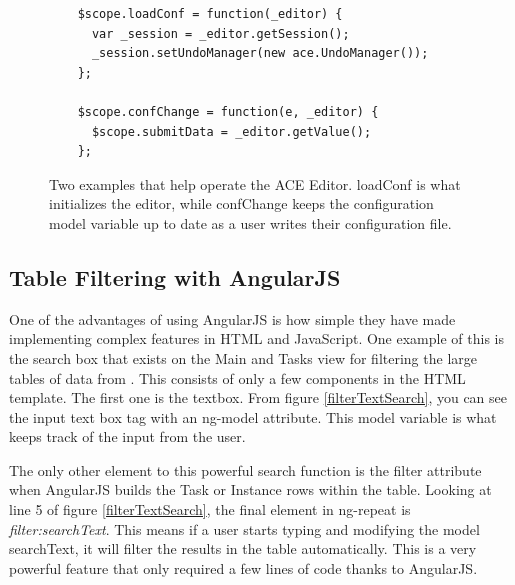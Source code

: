 \begin{figure}[H]
  \begin{center}
    \renewcommand{\theFancyVerbLine}{
      \sffamily\textcolor[rgb]{0.5,0.5,0.5}{\scriptsize\arabic{FancyVerbLine}}}
    \begin{verbatim}
    $scope.loadConf = function(_editor) {
      var _session = _editor.getSession();
      _session.setUndoManager(new ace.UndoManager());
    };

    $scope.confChange = function(e, _editor) {
      $scope.submitData = _editor.getValue();
    };
    \end{verbatim}

  \end{center}
  \caption{Two examples that help operate the ACE Editor. loadConf is what initializes the editor, while confChange keeps the configuration model variable up to date as a user writes their configuration file.}
  \label{aceEditorOnChange}
\end{figure}

\subsection{Table Filtering with AngularJS}

One of the advantages of using AngularJS is how simple they have made implementing complex features in HTML and JavaScript. One example of this is the search box that exists on the Main and Tasks view for filtering the large tables of data from \ancor{}. This consists of only a few components in the HTML template. The first one is the textbox. From figure \ref{filterTextSearch}, you can see the input text box tag with an ng-model attribute. This model variable is what keeps track of the input from the user.

The only other element to this powerful search function is the filter attribute when AngularJS builds the Task or Instance rows within the table. Looking at line 5 of figure \ref{filterTextSearch}, the final element in ng-repeat is \emph{filter:searchText}. This means if a user starts typing and modifying the model searchText, it will filter the results in the table automatically. This is a very powerful feature that only required a few lines of code thanks to AngularJS.

